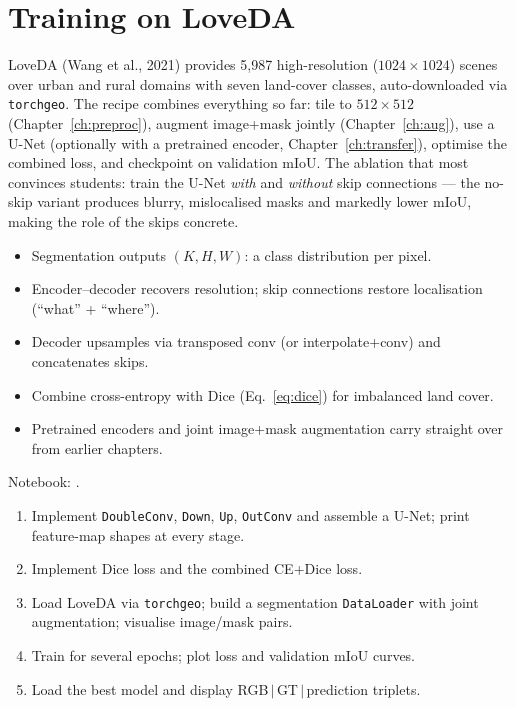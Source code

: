 \section{Training on LoveDA}

LoveDA (Wang et al., 2021) provides 5{,}987 high-resolution
($1024\times1024$) scenes over urban and rural domains with seven land-cover
classes, auto-downloaded via \texttt{torchgeo}. The recipe combines everything
so far: tile to $512\times512$ (Chapter~\ref{ch:preproc}), augment image+mask
jointly (Chapter~\ref{ch:aug}), use a U-Net (optionally with a pretrained
encoder, Chapter~\ref{ch:transfer}), optimise the combined loss, and checkpoint
on validation mIoU. The ablation that most convinces students: train the U-Net
\emph{with} and \emph{without} skip connections --- the no-skip variant produces
blurry, mislocalised masks and markedly lower mIoU, making the role of the skips
concrete.

\begin{keybox}
\begin{itemize}[leftmargin=1.2em,nosep]
  \item Segmentation outputs $(K,H,W)$: a class distribution per pixel.
  \item Encoder--decoder recovers resolution; skip connections restore localisation (``what'' + ``where'').
  \item Decoder upsamples via transposed conv (or interpolate+conv) and concatenates skips.
  \item Combine cross-entropy with Dice (Eq.~\ref{eq:dice}) for imbalanced land cover.
  \item Pretrained encoders and joint image+mask augmentation carry straight over from earlier chapters.
\end{itemize}
\end{keybox}

\begin{practbox}
Notebook: .
\begin{enumerate}[leftmargin=1.4em,nosep]
  \item Implement \texttt{DoubleConv}, \texttt{Down}, \texttt{Up}, \texttt{OutConv}
  and assemble a U-Net; print feature-map shapes at every stage.
  \item Implement Dice loss and the combined CE+Dice loss.
  \item Load LoveDA via \texttt{torchgeo}; build a segmentation \texttt{DataLoader}
  with joint augmentation; visualise image/mask pairs.
  \item Train for several epochs; plot loss and validation mIoU curves.
  \item Load the best model and display RGB\,$|$\,GT\,$|$\,prediction triplets.
\end{enumerate}
\end{practbox}

